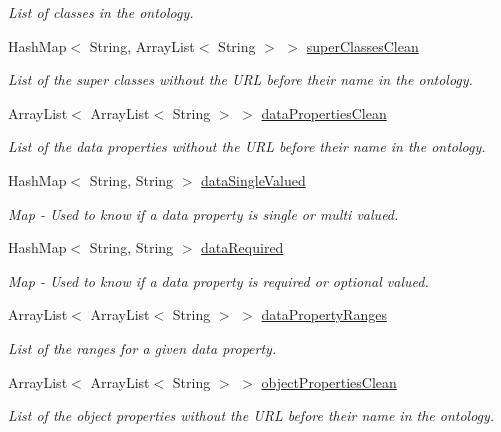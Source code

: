 \begin{DoxyCompactItemize}
\begin{DoxyCompactList}\small\item\em List of classes in the ontology. \end{DoxyCompactList}\item 
HashMap$<$ String, ArrayList$<$ String $>$ $>$ \hyperlink{class_data_base_1_1_tables_a5ec0af78ac892df612bf3ea7a91e37c5}{superClassesClean}
\begin{DoxyCompactList}\small\item\em List of the super classes without the URL before their name in the ontology. \end{DoxyCompactList}\item 
ArrayList$<$ ArrayList$<$ String $>$ $>$ \hyperlink{class_data_base_1_1_tables_af9e966f29b9024df669c77cc0d767c78}{dataPropertiesClean}
\begin{DoxyCompactList}\small\item\em List of the data properties without the URL before their name in the ontology. \end{DoxyCompactList}\item 
HashMap$<$ String, String $>$ \hyperlink{class_data_base_1_1_tables_a40e2a6f8f60048f0a393e9d03e8fcfd8}{dataSingleValued}
\begin{DoxyCompactList}\small\item\em Map -\/ Used to know if a data property is single or multi valued. \end{DoxyCompactList}\item 
HashMap$<$ String, String $>$ \hyperlink{class_data_base_1_1_tables_af968a71b80946ad236d287dad7a68774}{dataRequired}
\begin{DoxyCompactList}\small\item\em Map -\/ Used to know if a data property is required or optional valued. \end{DoxyCompactList}\item 
ArrayList$<$ ArrayList$<$ String $>$ $>$ \hyperlink{class_data_base_1_1_tables_ac4fac81e62e9331f412a2ede3ddcc502}{dataPropertyRanges}
\begin{DoxyCompactList}\small\item\em List of the ranges for a given data property. \end{DoxyCompactList}\item 
ArrayList$<$ ArrayList$<$ String $>$ $>$ \hyperlink{class_data_base_1_1_tables_aefcb4c8a578671a32a64c3196281f479}{objectPropertiesClean}
\begin{DoxyCompactList}\small\item\em List of the object properties without the URL before their name in the ontology. \end{DoxyCompactList}\item 

\end{DoxyCompactItemize}
